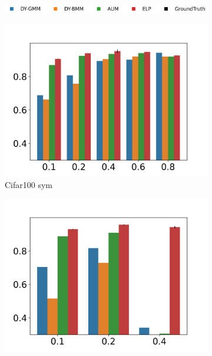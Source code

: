 \documentclass{article}
\begin{document}
\begin{figure}[b!]
    \centering
    \begin{subfigure}[b]{.95\textwidth}
        \includegraphics[width=.8\textwidth]{figs/F1legend_bar.png}
    \end{subfigure}
    \begin{subfigure}[b]{0.245\textwidth}
        \includegraphics[width=\textwidth]{figs/cifar100f1_bar.png}
    \vspace{-.5cm}
        \caption{Cifar100 sym}
        \label{cifar_sym}
    \end{subfigure}
    \begin{subfigure}[b]{0.245\textwidth}
        \includegraphics[width=\textwidth]{figs/cifar100af1_bar.png}

\end{subfigure}
\end{figure}
\end{document}
